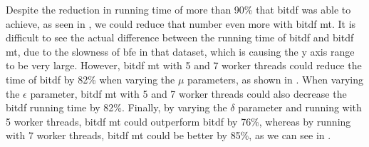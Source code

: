 {Despite the reduction in running time of more than 90\% that \ac{bitdf} was able to achieve, as seen in
, we could reduce that number even more with \ac{bitdf} \ac{mt}. It is difficult to see the actual
difference between the running time of \ac{bitdf} and \ac{bitdf} \ac{mt}, due to the slowness of \ac{bfe} in that
dataset, which is causing the y axis range to be very large. However, \ac{bitdf} \ac{mt} with 5 and 7 worker threads
could reduce the time of \ac{bitdf} by 82\% when varying the $\mu$ parameters, as shown in
. When varying the $\epsilon$ parameter, \ac{bitdf} \ac{mt} with 5 and 7 worker
threads could also decrease the \ac{bitdf} running time by 82\%. Finally, by varying the $\delta$ parameter and running
with 5 worker threads, \ac{bitdf} \ac{mt} could outperform \ac{bitdf} by 76\%, whereas by running with 7 worker threads,
\ac{bitdf} \ac{mt} could be better by 85\%, as we can see in .

}
